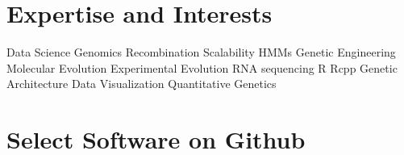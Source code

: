 \documentclass[11pt,letterpaper,sans]{moderncv}        %
\begin{document}
\vspace{4pt}

\section{Expertise and Interests}
Data Science  Genomics  Recombination  Scalability  HMMs   Genetic Engineering  Molecular Evolution  Experimental Evolution  RNA sequencing  R  Rcpp  Genetic Architecture  Data Visualization  Quantitative Genetics

\section{Select Software on Github}
\end{document}

